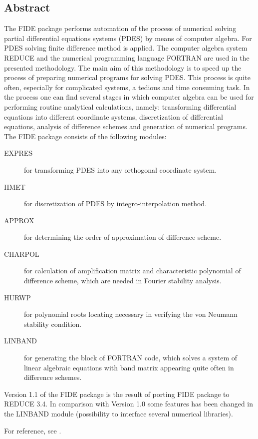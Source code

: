 
\subsection{Abstract}


     The FIDE  package performs  automation of  the process of numerical
solving  partial  differential  equations  systems  (PDES)  by  means of
computer algebra.  For PDES solving finite difference method is applied.
The  computer  algebra  system  REDUCE  and  the  numerical  programming
language FORTRAN  are used in the presented methodology. The main aim of
this methodology is to  speed  up  the  process  of  preparing numerical
programs for  solving PDES.  This process is quite often, especially for
complicated systems, a tedious and time consuming task.
     In the process  one  can  find  several  stages  in  which computer
algebra  can  be  used  for  performing routine analytical calculations,
namely: transforming differential  equations  into  different coordinate
systems,   discretization   of   differential   equations,  analysis  of
difference  schemes  and  generation  of  numerical  programs.  The FIDE
package consists of the following modules:
\begin{description}
  \item[EXPRES]  for transforming PDES into any orthogonal coordinate system.
  \item[IIMET]   for discretization of PDES by integro-interpolation method.
  \item[APPROX]  for determining the order of approximation of difference
          scheme.
  \item[CHARPOL] for calculation of amplification matrix and characteristic
          polynomial of difference scheme, which are needed in Fourier
          stability analysis.
  \item[HURWP]   for polynomial roots locating necessary in verifying the von
          Neumann stability condition.
  \item[LINBAND] for generating the block of FORTRAN code, which solves a
          system of linear algebraic equations with band matrix
          appearing quite often in difference schemes.
\end{description}
     Version  1.1  of  the  FIDE  package  is the result of porting FIDE
package to REDUCE 3.4. In comparison with Version 1.0 some features  has
been changed  in the  LINBAND module  (possibility to  interface several
numerical libraries).

For reference, see \cite{Liska:90}.




